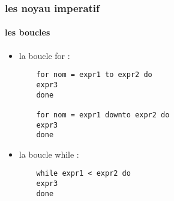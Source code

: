 \begin{frame}[fragile]
    \frametitle{les noyau imperatif}
    \framesubtitle{les boucles}
    \begin{itemize}
      \item
	la boucle for :
	\begin{lstlisting}
	for nom = expr1 to expr2 do 
	expr3
	done

	for nom = expr1 downto expr2 do
	expr3
	done
	\end{lstlisting}
      \item
	la boucle while :
	\begin{lstlisting}
	while expr1 < expr2 do
	expr3
	done
      \end{lstlisting}
  \end{itemize}
\end{frame}
